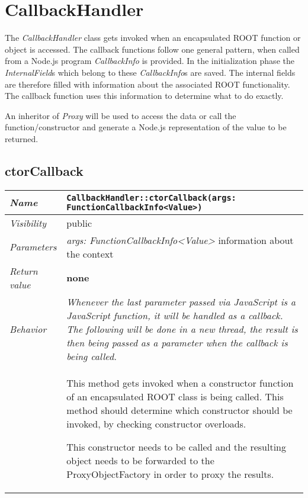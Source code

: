 \chapter{CallbackHandler}
The \textit{CallbackHandler} class gets invoked when an encapsulated ROOT function or object is accessed.
The callback functions follow one general pattern, when called from a Node.js program \textit{CallbackInfo} is provided.
In the initialization phase the \textit{InternalField}s which belong to these \textit{CallbackInfo}s are saved.
The internal fields are therefore filled with information about the associated ROOT functionality.
The callback function uses this information to determine what to do exactly.

An inheritor of \textit{Proxy} will be used to access the data or call the function/constructor and generate a Node.js representation of the value to be returned.
\section{ctorCallback}
\begin{longtable}{p{3cm} @{\hskip 1cm} p{12cm}}
 \hline
\textit{Name} & \texttt{CallbackHandler::ctorCallback(args: FunctionCallbackInfo<Value>)}\\
\hline
 \textit{Visibility} & public\\
\hline
\textit{Parameters} & \textit{args: FunctionCallbackInfo<Value>} information about the context\\
\hline
\textit{Return value} & \textbf{none}\\
  \hline
 \textit{Behavior} &
 \textit{Whenever the last parameter passed via JavaScript is a JavaScript function, it will be handled as a callback. The following will be done in a new thread, the result is then being passed as a parameter when the callback is being called.}\\

 & This method gets invoked when a constructor function of an encapsulated ROOT class is being called.
 This method should determine which constructor should be invoked, by checking constructor overloads.

 This constructor needs to be called and the resulting object needs to be forwarded to the ProxyObjectFactory in order to proxy the results.\\
\hline
\end{longtable}

